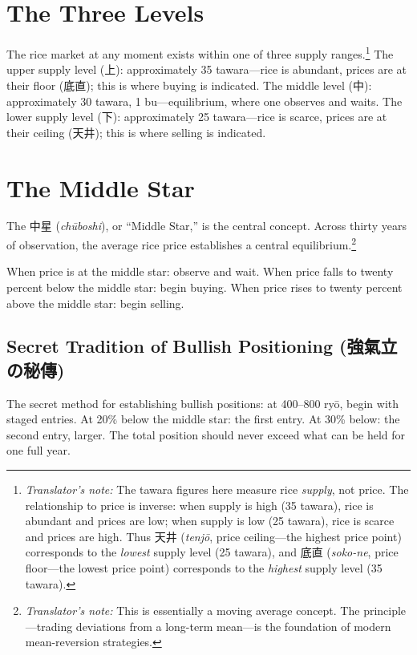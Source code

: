 \documentclass[10pt, openany]{book}
\newcommand{\jp}[1]{{\japanesefont #1}}
\newcommand{\tn}[1]{\footnote{\textit{Translator's note:} #1}}
\newcommand{\jt}[2]{\jp{#1} (\textit{#2})}
\begin{document}
\section{The Three Levels}

The rice market at any moment exists within one of three supply
ranges.\tn{The tawara figures here measure rice \textit{supply}, not
price. The relationship to price is inverse: when supply is high (35
tawara), rice is abundant and prices are low; when supply is low (25
tawara), rice is scarce and prices are high. Thus \jp{天井}
(\textit{tenj\=o}, price ceiling---the highest price point) corresponds
to the \textit{lowest} supply level (25 tawara), and \jp{底直}
(\textit{soko-ne}, price floor---the lowest price point) corresponds to
the \textit{highest} supply level (35 tawara).} The upper supply level
(\jp{上}): approximately 35 tawara---rice is abundant, prices are at
their floor (\jp{底直}); this is where buying is indicated. The middle
level (\jp{中}): approximately 30 tawara, 1 bu---equilibrium, where one
observes and waits. The lower supply level (\jp{下}): approximately 25
tawara---rice is scarce, prices are at their ceiling (\jp{天井}); this is
where selling is indicated.

\section{The Middle Star}

The \jt{中星}{ch\=uboshi}, or ``Middle Star,'' is the central concept.
Across thirty years of observation, the average rice price establishes a
central equilibrium.\tn{This is essentially a moving average concept. The
principle---trading deviations from a long-term mean---is the foundation of
modern mean-reversion strategies.}

When price is at the middle star: observe and wait. When price falls to
twenty percent below the middle star: begin buying. When price rises to
twenty percent above the middle star: begin selling.

\subsection{Secret Tradition of Bullish Positioning
(\jp{強氣立の秘傳})}

The secret method for establishing bullish positions: at 400--800 ry\=o,
begin with staged entries. At 20\% below the middle star: the first
entry. At 30\% below: the second entry, larger. The total position should
never exceed what can be held for one full year.
\end{document}
